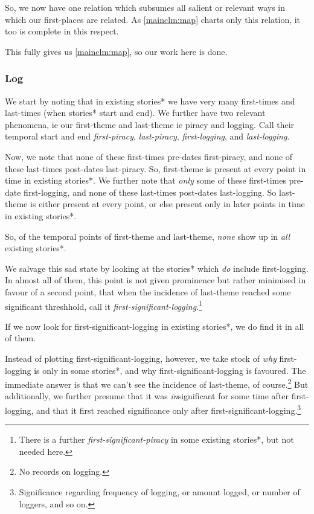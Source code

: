 \documentclass{amsart}
\newcommand{\mention}[1]{\textit{#1}}%
\theoremstyle{definition}
\theoremstyle{remark}
\begin{document}
			So, we now have one relation which subsumes all salient or relevant ways in which our first-places are related. As \ref{mainclm:map} charts only this relation, it too is complete in this respect.
			
			This fully gives us \ref{mainclm:map}, so our work here is done.
		\subsubsection{Log}
			\label{sss:log}
			We start by noting that in existing stories* we have very many first-times and last-times (when stories* start and end). We further have two relevant phenomena, ie our first-theme and last-theme ie piracy and logging. Call their temporal start and end \mention{first-piracy}, \mention{last-piracy}, \mention{first-logging}, and \mention{last-logging}.
			
			Now, we note that none of these first-times pre-dates first-piracy, and none of these last-times post-dates last-piracy. So, first-theme is present at every point in time in existing stories*. We further note that \emph{only} some of these first-times pre-date first-logging, and none of these last-times post-dates last-logging. So last-theme is either present at every point, or else present only in later points in time in existing stories*.
			
			So, of the temporal points of first-theme and last-theme, \emph{none} show up in \emph{all} existing stories*.
			
			We salvage this sad state by looking at the stories* which \emph{do} include first-logging. In almost all of them, this point is not given prominence but rather minimised in favour of a second point, that when the incidence of last-theme reached some significant threshhold, call it \mention{first-significant-logging}.\footnote{There is a further \mention{first-significant-piracy} in some existing stories*, but not needed here.}
			
			If we now look for first-significant-logging in existing stories*, we do find it in all of them.
			
			Instead of plotting first-significant-logging, however, we take stock of \emph{why} first-logging is only in some stories*, and why first-significant-logging is favoured. The immediate answer is that we can't see the incidence of last-theme, of course.\footnote{No records on logging.} But additionally, we further presume that it was \emph{in}significant for some time after first-logging, and that it first reached significance only after first-significant-logging.\footnote{Significance regarding frequency of logging, or amount logged, or number of loggers, and so on.}
			
\end{document}
